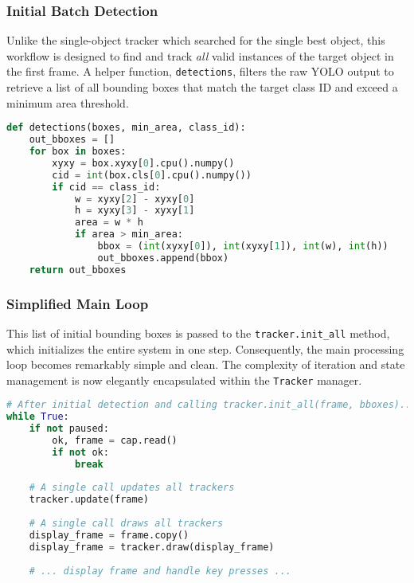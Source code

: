\documentclass[12pt, a4paper]{article}
\begin{document}
\subsubsection{Initial Batch Detection}
Unlike the single-object tracker which searched for the single best object, this workflow is designed to find and track \textit{all} valid instances of the target object in the first frame. A helper function, \lstinline!detections!, filters the raw YOLO output to retrieve a list of all bounding boxes that match the target class ID and exceed a minimum area threshold.

\begin{lstlisting}[language=Python, caption={Filtering YOLO output for initial batch detection.}, label={lst:batch_detection}]
def detections(boxes, min_area, class_id):
    out_bboxes = []
    for box in boxes:
        xyxy = box.xyxy[0].cpu().numpy()
        cid = int(box.cls[0].cpu().numpy())
        if cid == class_id:
            w = xyxy[2] - xyxy[0]
            h = xyxy[3] - xyxy[1]
            area = w * h
            if area > min_area:
                bbox = (int(xyxy[0]), int(xyxy[1]), int(w), int(h))
                out_bboxes.append(bbox)
    return out_bboxes
\end{lstlisting}

\subsubsection{Simplified Main Loop}
This list of initial bounding boxes is passed to the \lstinline!tracker.init_all! method, which initializes the entire system in one step. Consequently, the main processing loop becomes remarkably simple and clean. The complexity of iteration and state management is now elegantly encapsulated within the \lstinline!Tracker! manager.

\begin{lstlisting}[language=Python, caption={The simplified main loop for multi-object tracking.}, label={lst:multi_loop}]
# After initial detection and calling tracker.init_all(frame, bboxes)...
while True:
    if not paused:
        ok, frame = cap.read()
        if not ok:
            break
    
    # A single call updates all trackers
    tracker.update(frame)
    
    # A single call draws all trackers
    display_frame = frame.copy()
    display_frame = tracker.draw(display_frame)
    
    # ... display frame and handle key presses ...
\end{lstlisting}
\end{document}
